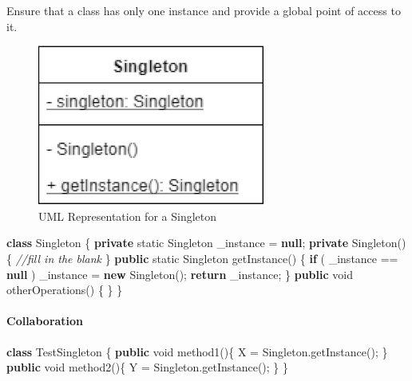 \documentclass[]{article}
\newenvironment{Shaded}{}{}
\newcommand{\CommentTok}[1]{\textcolor[rgb]{0.38,0.63,0.69}{\textit{#1}}}
\newcommand{\DataTypeTok}[1]{\textcolor[rgb]{0.56,0.13,0.00}{#1}}
\newcommand{\FunctionTok}[1]{\textcolor[rgb]{0.02,0.16,0.49}{#1}}
\newcommand{\KeywordTok}[1]{\textcolor[rgb]{0.00,0.44,0.13}{\textbf{#1}}}
\newcommand{\NormalTok}[1]{#1}
\let\oldparagraph\paragraph
\renewcommand{\paragraph}[1]{\oldparagraph{#1}\mbox{}}
\begin{document}
Ensure that a class has only one instance and provide a global point of
access to it.

\begin{figure}
\centering
\includegraphics{images/singleton.png}
\caption{UML Representation for a Singleton}
\end{figure}

\begin{Shaded}
\begin{Highlighting}[]
\KeywordTok{class}\NormalTok{ Singleton \{}
    \KeywordTok{private} \DataTypeTok{static}\NormalTok{ Singleton _instance = }\KeywordTok{null}\NormalTok{;}
    \KeywordTok{private} \FunctionTok{Singleton}\NormalTok{() \{}
        \CommentTok{//fill in the blank}
\NormalTok{    \}}
    \KeywordTok{public} \DataTypeTok{static}\NormalTok{ Singleton }\FunctionTok{getInstance}\NormalTok{() \{}
        \KeywordTok{if}\NormalTok{ ( _instance == }\KeywordTok{null}\NormalTok{ )}
\NormalTok{            _instance = }\KeywordTok{new} \FunctionTok{Singleton}\NormalTok{();}
            \KeywordTok{return}\NormalTok{ _instance;}
\NormalTok{        \}}
    \KeywordTok{public} \DataTypeTok{void} \FunctionTok{otherOperations}\NormalTok{() \{ \}}
\NormalTok{\}}
\end{Highlighting}
\end{Shaded}

\hypertarget{collaboration}{%
\paragraph{Collaboration}\label{collaboration}}

\begin{Shaded}
\begin{Highlighting}[]
\KeywordTok{class}\NormalTok{ TestSingleton \{}
    \KeywordTok{public} \DataTypeTok{void} \FunctionTok{method1}\NormalTok{()\{}
\NormalTok{        X = Singleton.}\FunctionTok{getInstance}\NormalTok{();}
\NormalTok{    \}}
    \KeywordTok{public} \DataTypeTok{void} \FunctionTok{method2}\NormalTok{()\{}
\NormalTok{        Y = Singleton.}\FunctionTok{getInstance}\NormalTok{();}
\NormalTok{    \}}
\NormalTok{\}}
\end{Highlighting}
\end{Shaded}
\end{document}
